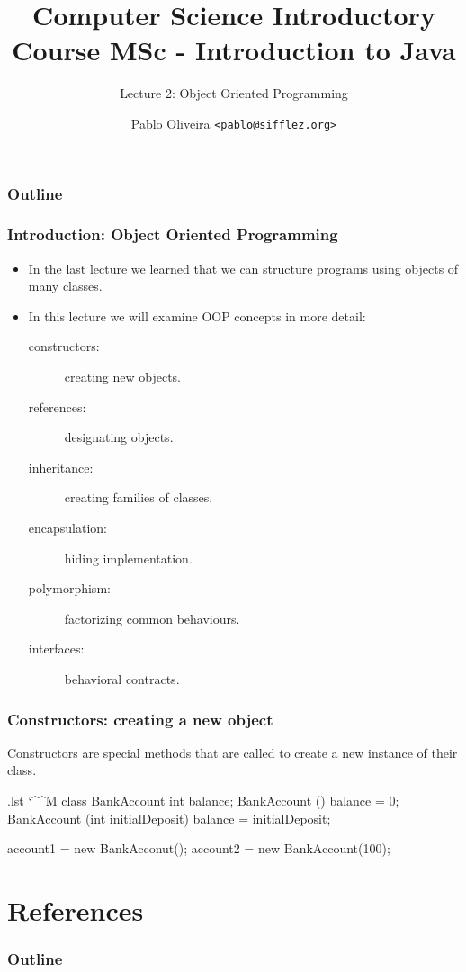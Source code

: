 \documentclass[10pt, handout]{beamer}
\title{Computer Science Introductory Course MSc - Introduction to Java}
\subtitle{Lecture 2: Object Oriented Programming}
\author[Pablo Oliveira]{Pablo Oliveira \texttt{<pablo@sifflez.org>}}
\institute{ENST}
\date{}
\makeatletter
\newenvironment{code}{%
  \begingroup
  \@bsphack
  \immediate\openout\lstvrb@out\jobname.lst
  \let\do\@makeother\dospecials\catcode`\^^M\active
  \def\verbatim@processline{%
    \immediate\write\lstvrb@out{\the\verbatim@line}}%
  \verbatim@start}{%
  \immediate\closeout\lstvrb@out
  \@esphack
  \endgroup
  
  \begin{alertblock}{}
    
  \end{alertblock}}
\makeatother
\begin{document}
\begin{frame}
  \titlepage
\end{frame}

\begin{frame}
  \frametitle{Outline}
  \tableofcontents
\end{frame}

\begin{frame}[fragile]
  \frametitle{Introduction: Object Oriented Programming}
  \begin{itemize}
    \item In the last lecture we learned that we can structure programs using 
          objects of many classes.
    \item In this lecture we will examine OOP concepts in more detail:
      \begin{description}
        \item[constructors:] creating new objects. 
        \item[references:] designating objects.
        \item[inheritance:] creating families of classes.
        \item[encapsulation:] hiding implementation.
        \item[polymorphism:] factorizing common behaviours.
        \item[interfaces:] behavioral contracts.
      \end{description}
    \end{itemize}
\end{frame}


\begin{frame}[fragile]
\frametitle{Constructors: creating a new object}

\begin{definition}
  Constructors are special methods that are called to create a new instance of their class.
\end{definition}

\begin{code}
  class BankAccount {
    int balance;
    BankAccount () {
      balance = 0;  
    }
    BankAccount (int initialDeposit){
      balance = initialDeposit;
    }
  }

  account1 = new BankAcconut();
  account2 = new BankAccount(100);
\end{code}
\end{frame}

\section{References}
\begin{frame}
  \frametitle{Outline}
  \tableofcontents[currentsection]
\end{frame}
\end{document}
